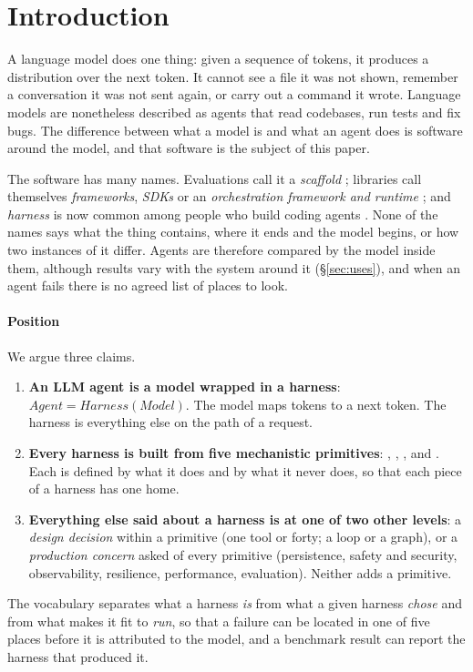 \section{Introduction}
\label{sec:intro}
A language model does one thing: given a sequence of tokens, it produces a distribution over the next token. It cannot see a file it was not shown, remember a conversation it was not sent again, or carry out a command it wrote. Language models are nonetheless described as agents that read codebases, run tests and fix bugs. The difference between what a model is and what an agent does is software around the model, and that software is the subject of this paper.

The software has many names. Evaluations call it a \emph{scaffold} \cite{anthropic2025swebench,metr2025update}; libraries call themselves \emph{frameworks}, \emph{SDKs} or an \emph{orchestration framework and runtime} \cite{langgraph}; and \emph{harness} is now common among people who build coding agents \cite{anthropic2025harnesses}. None of the names says what the thing contains, where it ends and the model begins, or how two instances of it differ. Agents are therefore compared by the model inside them, although results vary with the system around it (\S\ref{sec:uses}), and when an agent fails there is no agreed list of places to look.

\paragraph{Position} We argue three claims.
\begin{enumerate}
  \item \textbf{An LLM agent is a model wrapped in a harness}: $\textit{Agent} = \textit{Harness}(\textit{Model})$. The model maps tokens to a next token. The harness is everything else on the path of a request.
  \item \textbf{Every harness is built from five mechanistic primitives}: , , ,  and . Each is defined by what it does and by what it never does, so that each piece of a harness has one home.
  \item \textbf{Everything else said about a harness is at one of two other levels}: a \emph{design decision} within a primitive (one tool or forty; a loop or a graph), or a \emph{production concern} asked of every primitive (persistence, safety and security, observability, resilience, performance, evaluation). Neither adds a primitive.
\end{enumerate}
The vocabulary separates what a harness \emph{is} from what a given harness \emph{chose} and from what makes it fit to \emph{run}, so that a failure can be located in one of five places before it is attributed to the model, and a benchmark result can report the harness that produced it.

